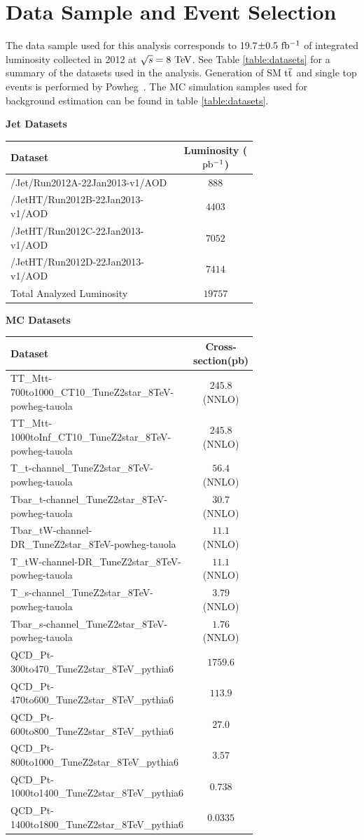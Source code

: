 \chapter{Data Sample and Event Selection}
\label{sec:datasampleAndSelection}
The data sample used for this analysis corresponds to 19.7$\pm0.5~\mathrm{fb^{-1}}$ of integrated 
luminosity collected in 2012 at $\sqrt{s} = 8~\mathrm{TeV}$.  See Table \ref{table:datasets} for a summary of the datasets used in the analysis.
Generation of SM $\mathrm{t\overline{t}}$ and single top events is performed by Powheg~\cite{Oleari:2010nx}.  
The MC simulation samples used for background estimation can be found in table \ref{table:datasets}.

\begin{table}
\begin{center}
\bf{Jet Datasets}
\begin{tabular}{|p{0.7\linewidth}|c|}
\hline
\bf{Dataset} & \bf{Luminosity ($\mathrm{pb^{-1}}$)} \\
\hline
/Jet/Run2012A-22Jan2013-v1/AOD & $888$ \\
/JetHT/Run2012B-22Jan2013-v1/AOD & $4403$ \\
/JetHT/Run2012C-22Jan2013-v1/AOD & $7052$ \\
/JetHT/Run2012D-22Jan2013-v1/AOD & $7414$ \\
\hline
Total Analyzed Luminosity & $19757$ \\
\hline
\end{tabular}
\bf{MC Datasets} \\
\begin{tabular}{|p{0.7\linewidth}|c|}
\hline
\bf{Dataset} & \bf{Cross-section(pb)} \\
\hline
TT\_Mtt-700to1000\_CT10\_TuneZ2star\_8TeV-powheg-tauola & $245.8$ (NNLO)\\
TT\_Mtt-1000toInf\_CT10\_TuneZ2star\_8TeV-powheg-tauola & $245.8$ (NNLO)\\
T\_t-channel\_TuneZ2star\_8TeV-powheg-tauola & $56.4$ (NNLO)\\
Tbar\_t-channel\_TuneZ2star\_8TeV-powheg-tauola & $30.7$ (NNLO)\\
Tbar\_tW-channel-DR\_TuneZ2star\_8TeV-powheg-tauola & $11.1$ (NNLO)\\
T\_tW-channel-DR\_TuneZ2star\_8TeV-powheg-tauola & $11.1$ (NNLO)\\
T\_s-channel\_TuneZ2star\_8TeV-powheg-tauola & $3.79$ (NNLO)\\
Tbar\_s-channel\_TuneZ2star\_8TeV-powheg-tauola & $1.76$ (NNLO)\\
QCD\_Pt-300to470\_TuneZ2star\_8TeV\_pythia6 & $1759.6$ \\
QCD\_Pt-470to600\_TuneZ2star\_8TeV\_pythia6 & $113.9$ \\
QCD\_Pt-600to800\_TuneZ2star\_8TeV\_pythia6 & $27.0$ \\
QCD\_Pt-800to1000\_TuneZ2star\_8TeV\_pythia6 & $3.57$ \\
QCD\_Pt-1000to1400\_TuneZ2star\_8TeV\_pythia6 & $0.738$ \\
QCD\_Pt-1400to1800\_TuneZ2star\_8TeV\_pythia6 & $0.0335$ \\
\hline


\end{tabular}
\end{center}
\end{table}

